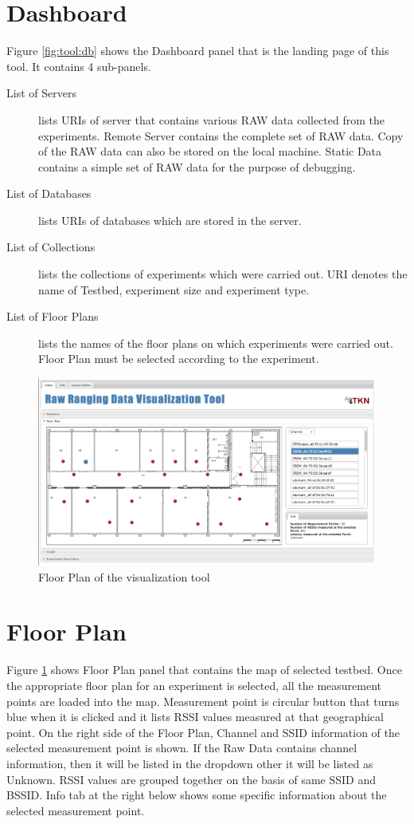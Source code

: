 \documentclass[11pt,a4paper,headinclude,footinclude,chapterprefix=on]{scrreprt}
\begin{document}
\section{Dashboard} 
Figure \ref{fig:tool:db} shows the Dashboard panel that is the landing page of this tool. It contains 4 sub-panels. 

\begin{description}
\item[List of Servers] lists URIs of server that contains various RAW data collected from the experiments. Remote Server contains the complete set of RAW data. Copy of the RAW data can also be stored on the local machine. Static Data contains a simple set of RAW data for the purpose of debugging. 
\item[List of Databases] lists URIs of databases which are stored in the server. 
\item[List of Collections] lists the collections of experiments which were carried out. URI denotes the name of Testbed, experiment size and experiment type.
\item[List of Floor Plans] lists the names of the floor plans on which experiments were carried out. Floor Plan must be selected according to the experiment. 
\end{description}

\begin{figure}
	[!h] \centering 
	\includegraphics[width=15cm]{Images/tool_floor.png} \caption{Floor Plan of the visualization tool} \label{fig:tool:floor} 
\end{figure}

\section{Floor Plan} 
Figure \ref{fig:tool:floor} shows Floor Plan panel that contains the map of selected testbed. Once the appropriate floor plan for an experiment is selected, all the measurement points are loaded into the map. Measurement point is circular button that turns blue when it is clicked and it lists RSSI values measured at that geographical point. On the right side of the Floor Plan, Channel and SSID information of the selected measurement point is shown. If the Raw Data contains channel information, then it will be listed in the dropdown other it will be listed as Unknown. RSSI values are grouped together on the basis of same SSID and BSSID. Info tab at the right below shows some specific information about the selected measurement point.
\end{document}
